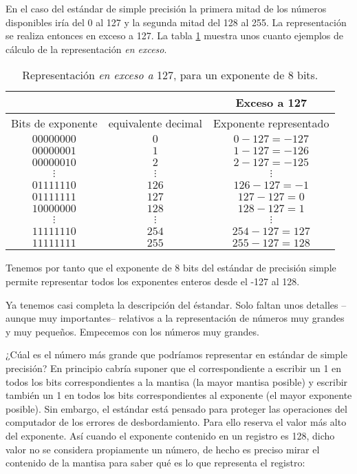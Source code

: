 En el caso del estándar de simple precisión la primera mitad de los números disponibles iría del 0 al 127 y la segunda mitad del 128 al 255. La representación se realiza entonces en exceso a 127. La tabla \ref{tabex} muestra unos cuanto ejemplos de cálculo de la representación \emph{en exceso}.
\begin{table}
\centering
\begin{tabular}{ccc}
&&Exceso a 127\\
\hline
Bits de exponente&equivalente decimal&Exponente representado\\
\hline      
$00000000$&$0$&$0-127=-127$\\
\hline
$00000001$&$1$&$1-127=-126$\\
\hline
$00000010$&$2$&$2-127=-125$\\
\hline
$\vdots$&$\vdots$&$\vdots$\\
\hline
$01111110$&$126$&$126-127=-1$\\
\hline
$01111111$&$127$&$127-127=0$\\
\hline
$10000000$&$128$&$128-127=1$\\
\hline
$\vdots$&$\vdots$&$\vdots$\\
\hline
$11111110$&$254$&$254-127=127$\\
\hline
$11111111$&$255$&$255-127=128$\\
\hline
\end{tabular}
\caption{Representación \emph{en exceso a} 127, para un exponente de 8 bits.}
\label{tabex}
\end{table}

Tenemos por tanto que el exponente de 8 bits del estándar de precisión simple permite representar todos los exponentes enteros desde el -127 al 128.

Ya tenemos casi completa la descripción del éstandar. Solo faltan unos detalles --aunque muy importantes-- relativos a la representación de números muy grandes y muy pequeños. Empecemos con los números muy grandes.

¿Cúal es el número más grande que podríamos representar en estándar de simple precisión? En principio cabría suponer que el correspondiente a escribir un 1 en todos los bits correspondientes a la mantisa (la mayor mantisa posible) y escribir también un 1 en todos los bits correspondientes al exponente (el mayor exponente posible). Sin embargo, el estándar está pensado para proteger las operaciones del computador de los errores de desbordamiento. Para ello reserva el valor más alto del exponente. Así cuando el exponente contenido en un registro es 128, dicho valor no se considera propiamente un número, de hecho es preciso mirar el contenido de la mantisa para saber qué es lo que representa el registro: 


